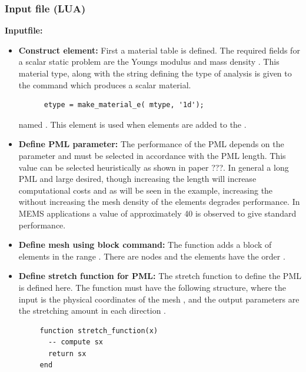 \clearpage
\subsubsection*{Input file (LUA)}
\begin{flushleft}
  \textbf{Inputfile:}
  \\
\end{flushleft}
\hspace{1in}
{\footnotesize
{}
}

\clearpage
\begin{itemize}

  \item{\textbf{Construct element:}}
  First a material table  is defined. The
  required fields for a scalar static problem are 
  the Youngs modulus  and mass density .
  This material type, along with the string defining the 
  type of analysis is given to the command 
  which produces a scalar material.
  \begin{verbatim}
      etype = make_material_e( mtype, '1d');
  \end{verbatim}
  named .
  This element is used when elements are added to the .

  \item{\textbf{Define PML parameter:}}
  The performance of the PML depends on the parameter  and
  must be selected in accordance with the PML length.
  This value can be selected heuristically as shown in paper ???. 
  In general a long PML and large  desired, though
  increasing the length will increase computational costs and 
  as will be seen in the example, increasing the  without
  increasing the mesh density of the elements degrades performance.
  In MEMS applications a value of approximately 40 is observed to
  give standard performance.

  \item{\textbf{Define mesh using block command:}}
  The function  adds a block of elements in the 
  range \ttt{[0, xrad]}. There are  nodes and 
  the elements have the order .

  \item{\textbf{Define stretch function for PML:}}
  The stretch function to define the PML is defined here.
  The function must have the following structure, where
  the input is the physical coordinates of the mesh , 
  and the output parameters are the stretching amount
  in each direction .
  \begin{verbatim}
     function stretch_function(x)
       -- compute sx
       return sx
     end
  \end{verbatim}


\end{itemize}
